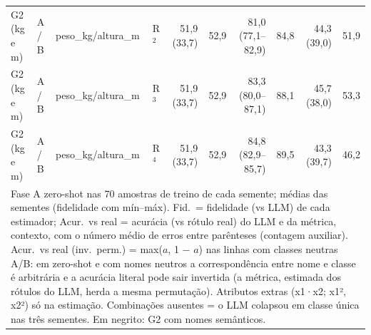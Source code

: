 \begin{table}[htbp]
\begin{tabular}{llllrrrrrr}
\midrule
G2 (kg e m) & A / B & peso\_kg/altura\_m & R$^2$ & 51,9 (33,7) & 52,9 & 81,0 (77,1–82,9) & 84,8 & 44,3 (39,0) & 51,9 \\
G2 (kg e m) & A / B & peso\_kg/altura\_m & R$^3$ & 51,9 (33,7) & 52,9 & 83,3 (80,0–87,1) & 88,1 & 45,7 (38,0) & 53,3 \\
G2 (kg e m) & A / B & peso\_kg/altura\_m & R$^4$ & 51,9 (33,7) & 52,9 & 84,8 (82,9–85,7) & 89,5 & 43,3 (39,7) & 46,2 \\
\bottomrule
\multicolumn{10}{p{0.95\linewidth}}{\footnotesize Fase A zero-shot nas 70 amostras de treino de cada semente; médias das sementes (fidelidade com mín–máx). Fid.\ = fidelidade (vs LLM) de cada estimador; Acur.\ vs real = acurácia (vs rótulo real) do LLM e da métrica, contexto, com o número médio de erros entre parênteses (contagem auxiliar). Acur.\ vs real (inv.\ perm.) = max($a$, 1 $-$ $a$) nas linhas com classes neutras A/B: em zero-shot e com nomes neutros a correspondência entre nome e classe é arbitrária e a acurácia literal pode sair invertida (a métrica, estimada dos rótulos do LLM, herda a mesma permutação). Atributos extras (x1·x2; x1², x2²) só na estimação. Combinações ausentes = o LLM colapsou em classe única nas três sementes. Em negrito: G2 com nomes semânticos.} \\
\end{tabular}
\end{table}
